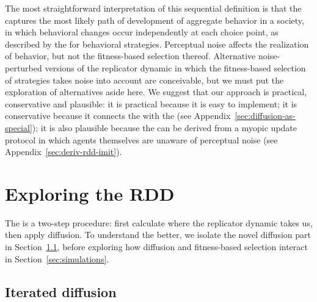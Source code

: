 \documentclass[fleqn,reqno,10pt]{article}
\newcommand{\rd}{\acro{rd}} %
\newcommand{\rmd}{\acro{rmd}} %
\newcommand{\rdd}{\acro{rdd}} %
\begin{document}
The most straightforward interpretation of this sequential definition is that the \rdd captures
the most likely path of development of aggregate behavior in a society, in which behavioral
changes occur independently at each choice point, as described by the \rd for behavioral
strategies. Perceptual noise affects the realization of behavior, but not the fitness-based
selection thereof. Alternative noise-perturbed versions of the replicator dynamic in which the
fitness-based selection of strategies takes noise into account are conceivable, but we must put
the exploration of alternatives aside here. We suggest that our approach is practical,
conservative and plausible: it is practical because it is easy to implement; it is conservative
because it connects the \rdd with the \rmd (see Appendix~\ref{sec:diffusion-as-special}); it is
also plausible because the \rdd can be derived from a myopic update protocol in which agents
themselves are unaware of perceptual noise (see Appendix~\ref{sec:deriv-rdd-imit}).



\section{Exploring the RDD}
\label{sec:exploring-rdd}

The \rdd is a two-step procedure: first calculate where the replicator dynamic takes us, then
apply diffusion. To understand the \rdd better, we isolate the novel diffusion part in
Section~\ref{sec:iterated-diffusion}, before exploring how diffusion and fitness-based
selection interact in Section~\ref{sec:simulations}.

\subsection{Iterated diffusion}
\label{sec:iterated-diffusion}
\end{document}
